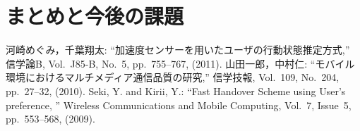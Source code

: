 \documentclass[twocolumn, a4paper]{icethesisabst}
\begin{document}
\section{まとめと今後の課題}

\begin{thebibliography}{99}
河崎めぐみ，千葉翔太:
``加速度センサーを用いたユーザの行動状態推定方式,''
信学論B, Vol.~J85-B, No.~5, pp.~755--767, (2011).
山田一郎，中村仁:
``モバイル環境におけるマルチメディア通信品質の研究,''
信学技報, Vol.~109, No.~204, pp.~27--32, (2010).
Seki, Y. and Kirii, Y.:
``Fast Handover Scheme using User's preference, ''
Wireless Communications and Mobile Computing,
Vol.~7, Issue~5, pp.~553--568, (2009).
\end{thebibliography}
\end{document}

